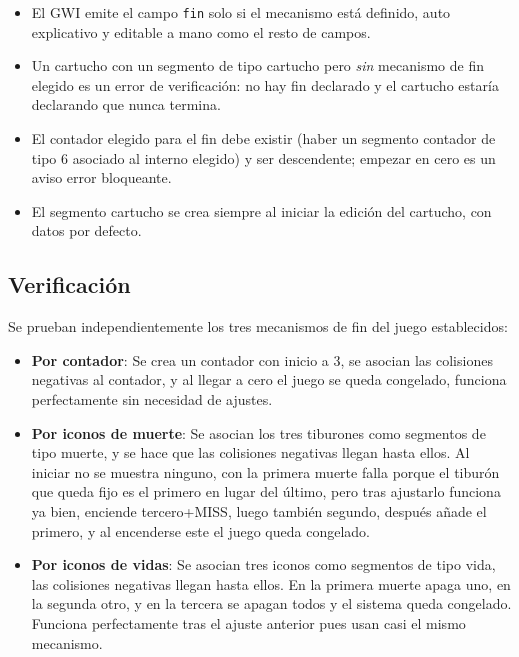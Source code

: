 \begin{itemize}
	\item El GWI emite el campo \texttt{fin} solo si el mecanismo está
	definido, auto explicativo y editable a mano como el resto de campos.
	\item Un cartucho con un segmento de tipo cartucho pero \emph{sin} mecanismo de fin
	elegido es un error de verificación: no hay fin declarado y el cartucho
	estaría declarando que nunca termina.
	\item El contador elegido para el fin debe existir (haber un segmento contador de
	tipo 6 asociado al interno elegido) y ser descendente; empezar en cero es
	un aviso error bloqueante.
	\item El segmento cartucho se crea siempre al iniciar la edición del cartucho, con datos por defecto.
\end{itemize}

\subsection{Verificación}
\label{subsec:VerificacionF3I11}

Se prueban independientemente los tres mecanismos de fin del juego establecidos:

\begin{itemize}
	\item \textbf{Por contador}: Se crea un contador con inicio a 3, se asocian las colisiones negativas al contador, y al llegar a cero el juego se queda congelado, funciona perfectamente sin necesidad de ajustes.
	
	\item \textbf{Por iconos de muerte}: Se asocian los tres tiburones como segmentos de tipo muerte, y se hace que las colisiones negativas llegan hasta ellos. Al iniciar no se muestra ninguno, con la primera muerte falla porque el tiburón que queda fijo es el primero en lugar del último, pero tras ajustarlo funciona ya bien, enciende tercero+MISS, luego también segundo, después añade el primero, y al encenderse este el juego queda congelado.
	
	\item \textbf{Por iconos de vidas}: Se asocian tres iconos como segmentos de tipo vida, las colisiones negativas llegan hasta ellos. En la primera muerte apaga uno, en la segunda otro, y en la tercera se apagan todos y el sistema queda congelado. Funciona perfectamente tras el ajuste anterior pues usan casi el mismo mecanismo.
\end{itemize}

\clearpage